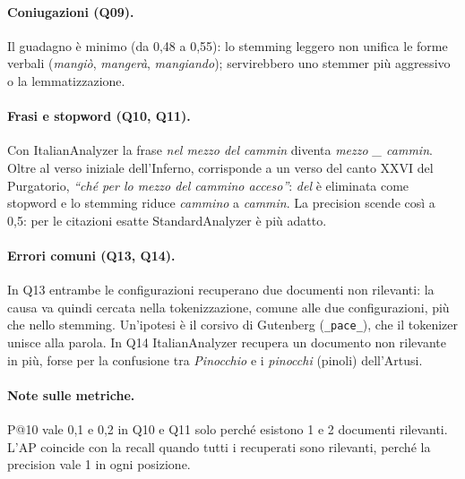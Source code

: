 \documentclass[10pt,a4paper,twocolumn]{article}
\newcommand{\cls}[1]{\textsf{#1}}
\begin{document}
\paragraph{Coniugazioni (Q09).} Il guadagno è minimo (da 0,48 a 0,55): lo stemming leggero non unifica le forme
verbali (\emph{mangiò}, \emph{mangerà}, \emph{mangiando}); servirebbero uno stemmer più aggressivo o la
lemmatizzazione.

\paragraph{Frasi e stopword (Q10, Q11).} Con \cls{ItalianAnalyzer} la frase \emph{nel mezzo del cammin} diventa
\emph{mezzo \_ cammin}. Oltre al verso iniziale dell'Inferno, corrisponde a un verso del canto XXVI del Purgatorio,
\emph{``ché per lo mezzo del cammino acceso''}: \emph{del} è eliminata come stopword e lo stemming riduce
\emph{cammino} a \emph{cammin}. La precision scende così a 0,5: per le citazioni esatte \cls{StandardAnalyzer}
è più adatto.

\paragraph{Errori comuni (Q13, Q14).} In Q13 entrambe le configurazioni recuperano due documenti non rilevanti:
la causa va quindi cercata nella tokenizzazione, comune alle due configurazioni, più che nello stemming. Un'ipotesi è il corsivo di Gutenberg
(\texttt{\_pace\_}), che il tokenizer unisce alla parola. In Q14 \cls{ItalianAnalyzer} recupera un documento non
rilevante in più, forse per la confusione tra \emph{Pinocchio} e i \emph{pinocchi} (pinoli) dell'Artusi.

\paragraph{Note sulle metriche.} P@10 vale 0,1 e 0,2 in Q10 e Q11 solo perché esistono 1 e 2 documenti
rilevanti. L'AP coincide con la recall quando tutti i recuperati sono rilevanti, perché la precision vale 1 in
ogni posizione.

\end{document}
